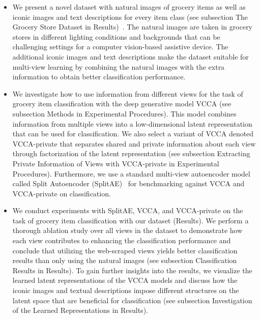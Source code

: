 \begin{itemize}
    \item We present a novel dataset with natural images of grocery items as well as iconic images and text descriptions for every item class (see subsection The Grocery Store Dataset in Results)~.
    The natural images are taken in grocery stores in different lighting conditions and backgrounds that can be challenging settings for a computer vision-based assistive device. The additional iconic images and text descriptions make the dataset suitable for multi-view learning by combining the natural images with the extra information to obtain better classification performance.  
    
    \item We investigate how to use information from different views for the task of grocery item classification with the deep generative model VCCA (see subsection Methods in Experimental Procedures).
    This model combines information from multiple views into a low-dimensional latent representation that can be used for classification. We also select a variant of VCCA denoted VCCA-private that separates shared and private information about each view through factorization of the latent representation (see subsection Extracting Private Information of Views with VCCA-private in Experimental Procedures). 
    Furthermore, we use a standard multi-view autoencoder model called Split Autoencoder (SplitAE)~ for benchmarking against VCCA and VCCA-private on classification.
    
    \item We conduct experiments with SplitAE, VCCA, and VCCA-private on the task of grocery item classification with our dataset (Results).
    We perform a thorough ablation study over all views in the dataset to demonstrate how each view contributes to enhancing the classification performance and conclude that utilizing the web-scraped views yields better classification results than only using the natural images (see subsection Classification Results in Results).
    To gain further insights into the results, we visualize the learned latent representations of the VCCA models and discuss how the iconic images and textual descriptions impose different structures on the latent space that are beneficial for classification (see subsection Investigation of the Learned Representations in Results).
    
\end{itemize}
